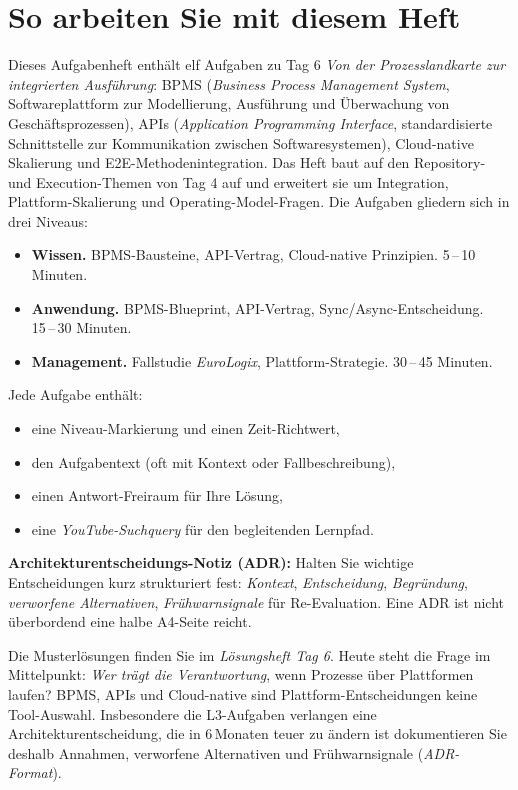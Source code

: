 \documentclass[11pt,a4paper,oneside]{article}
\newcommand{\fachbegriff}[1]{\textbf{#1}}
\newcommand{\niveaubadge}[2]{%
  \tcbox[on line, colback=#1, colframe=#1, coltext=white,
         boxrule=0pt, arc=2pt, left=5pt,right=5pt,top=1pt,bottom=1pt,
         nobeforeafter]{\sffamily\bfseries\footnotesize #2}%
}
\newcommand{\nivLi}{\niveaubadge{lpL1}{L1\,\textbullet\,Wissen}}
\newcommand{\nivLii}{\niveaubadge{lpL2}{L2\,\textbullet\,Anwendung}}
\newcommand{\nivLiii}{\niveaubadge{lpL3}{L3\,\textbullet\,Management}}
\begin{document}
\section*{So arbeiten Sie mit diesem Heft}
\thispagestyle{plain}

\noindent Dieses Aufgabenheft enth\"alt elf Aufgaben zu Tag 6 \textendash{} \emph{Von der Prozesslandkarte zur integrierten Ausf\"uhrung}: BPMS (\emph{Business Process Management System}, Softwareplattform zur Modellierung, Ausf\"uhrung und \"Uberwachung von Gesch\"aftsprozessen), APIs (\emph{Application Programming Interface}, standardisierte Schnittstelle zur Kommunikation zwischen Softwaresystemen), Cloud-native Skalierung und E2E-Methodenintegration. Das Heft baut auf den Repository- und Execution-Themen von Tag 4 auf und erweitert sie um Integration, Plattform-Skalierung und Operating-Model-Fragen. Die Aufgaben gliedern sich in drei Niveaus:

\begin{itemize}
  \item \nivLi{} \textendash{} \fachbegriff{Wissen.} BPMS-Bausteine, API-Vertrag, Cloud-native Prinzipien. 5\,--\,10 Minuten.
  \item \nivLii{} \textendash{} \fachbegriff{Anwendung.} BPMS-Blueprint, API-Vertrag, Sync/Async-Entscheidung. 15\,--\,30 Minuten.
  \item \nivLiii{} \textendash{} \fachbegriff{Management.} Fallstudie \emph{EuroLogix}, Plattform-Strategie. 30\,--\,45 Minuten.
\end{itemize}

\noindent Jede Aufgabe enth\"alt:
\begin{itemize}
  \item eine Niveau-Markierung und einen Zeit-Richtwert,
  \item den Aufgabentext (oft mit Kontext oder Fallbeschreibung),
  \item einen Antwort-Freiraum f\"ur Ihre L\"osung,
  \item eine \emph{YouTube-Suchquery} f\"ur den begleitenden Lernpfad.
\end{itemize}

\noindent\textbf{Architekturentscheidungs-Notiz (ADR):} Halten Sie wichtige Entscheidungen kurz strukturiert fest: \emph{Kontext}, \emph{Entscheidung}, \emph{Begr\"undung}, \emph{verworfene Alternativen}, \emph{Fr\"uhwarnsignale} f\"ur Re-Evaluation. Eine ADR ist nicht \"uberbordend \textendash{} eine halbe A4-Seite reicht.

\begin{infobox}[Hinweis]
Die Musterl\"osungen finden Sie im \emph{L\"osungsheft Tag 6}. Heute steht die Frage im Mittelpunkt: \emph{Wer tr\"agt die Verantwortung}, wenn Prozesse \"uber Plattformen laufen? BPMS, APIs und Cloud-native sind Plattform-Entscheidungen \textendash{} keine Tool-Auswahl. Insbesondere die L3-Aufgaben verlangen eine Architekturentscheidung, die in 6\,Monaten teuer zu \"andern ist \textendash{} dokumentieren Sie deshalb Annahmen, verworfene Alternativen und Fr\"uhwarnsignale (\emph{ADR-Format}).
\end{infobox}
\end{document}
